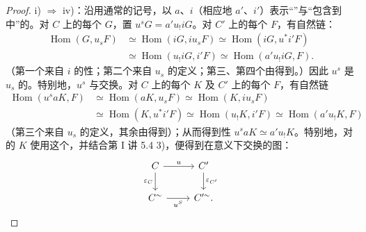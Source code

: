 \begin{proof}
\noindent i) $\Rightarrow$ iv)：沿用通常的记号，以 $a$、$i$（相应地 $a'$、$i'$）表示“”与“包含到中”的。对 $C$ 上的每个 $G$，置 $u^sG=a'u_!iG$。对 $C'$ 上的每个 $F$，有自然链：
\[
\begin{aligned}
 \operatorname{Hom}(G,u_sF)&\simeq\operatorname{Hom}(iG,iu_sF)
 \simeq\operatorname{Hom}(iG,u^*i'F)\\
 &\simeq\operatorname{Hom}(u_!iG,i'F)
 \simeq\operatorname{Hom}(a'u_!iG,F).
\end{aligned}
\]
（第一个来自 $i$ 的性；第二个来自 $u_s$ 的定义；第三、第四个由得到。）因此 $u^s$ 是 $u_s$ 的。特别地，$u^s$ 与交换。对 $C$ 上的每个 $K$ 及 $C'$ 上的每个 $F$，有自然链
\[
\begin{aligned}
 \operatorname{Hom}(u^saK,F)&\simeq\operatorname{Hom}(aK,u_sF)
 \simeq\operatorname{Hom}(K,iu_sF)\\
 &\simeq\operatorname{Hom}(K,u^*i'F)
 \simeq\operatorname{Hom}(u_!K,i'F)
 \simeq\operatorname{Hom}(a'u_!K,F)
\end{aligned}
\]
（第三个来自 $u_s$ 的定义，其余由得到）；从而得到性 $u^saK\simeq a'u_!K$。特别地，对的 $K$ 使用这个，并结合第 I 讲 5.4 3)，便得到在意义下交换的图：
\[
\begin{tikzcd}
 C\arrow[r,"u"]\arrow[d,"\varepsilon_C"'] & C'\arrow[d,"\varepsilon_{C'}"]\\
 C^{\sim}\arrow[r,"u^S"'] & C'^{\sim}.
\end{tikzcd}
\]


\end{proof}
